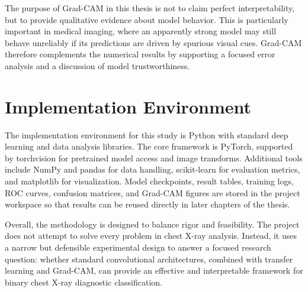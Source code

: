 The purpose of Grad-CAM in this thesis is not to claim perfect interpretability, but to provide qualitative evidence about model behavior. This is particularly important in medical imaging, where an apparently strong model may still behave unreliably if its predictions are driven by spurious visual cues. Grad-CAM therefore complements the numerical results by supporting a focused error analysis and a discussion of model trustworthiness.

\section{Implementation Environment}
The implementation environment for this study is Python with standard deep learning and data analysis libraries. The core framework is PyTorch, supported by torchvision for pretrained model access and image transforms. Additional tools include NumPy and pandas for data handling, scikit-learn for evaluation metrics, and matplotlib for visualization. Model checkpoints, result tables, training logs, ROC curves, confusion matrices, and Grad-CAM figures are stored in the project workspace so that results can be reused directly in later chapters of the thesis.

Overall, the methodology is designed to balance rigor and feasibility. The project does not attempt to solve every problem in chest X-ray analysis. Instead, it uses a narrow but defensible experimental design to answer a focused research question: whether standard convolutional architectures, combined with transfer learning and Grad-CAM, can provide an effective and interpretable framework for binary chest X-ray diagnostic classification.
